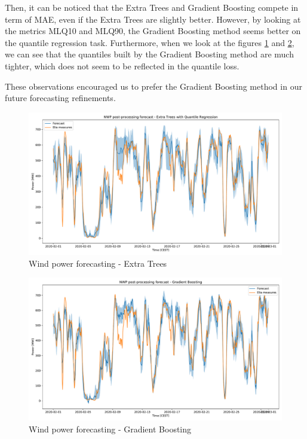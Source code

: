 \documentclass[a4paper, 12pt]{article}
\begin{document}
    Then, it can be noticed that the Extra Trees and Gradient Boosting compete in term of MAE, even if the Extra Trees are slightly better. 
    However, by looking at the metrics MLQ10 and MLQ90, the Gradient Boosting method seems better on the quantile regression task. Furthermore, when we look at the figures \ref{fig:wind_xt} and \ref{fig:wind_gb}, we can see that the quantiles built by the Gradient Boosting method are much tighter, which does not seem to be reflected in the quantile loss.
    
    These observations encouraged us to prefer the Gradient Boosting method in our future forecasting refinements.
    
    \begin{figure}[H]
        \centering
        \includegraphics[width=\textwidth]{resources/pdf/wind_xt.pdf}
        \caption{Wind power forecasting - Extra Trees}
        \label{fig:wind_xt}
    \end{figure}
    
    \begin{figure}[H]
        \centering
        \includegraphics[width=\textwidth]{resources/pdf/wind_gb.pdf}
        \caption{Wind power forecasting - Gradient Boosting}
        \label{fig:wind_gb}
    \end{figure}
    
\end{document}
